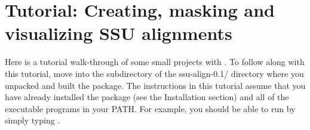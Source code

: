 \section{Tutorial: Creating, masking and visualizing SSU alignments}
\label{sec:tutorial}

Here is a tutorial walk-through of some small projects with
. To follow along with this tutorial, move into the
 subdirectory of the {ssu-align-0.1/} directory where
you unpacked and built the package.
The instructions in this tutorial assume that you have already
installed the package (see the Installation section)
and all of the  executable programs
in your PATH. For example, you should be able to run
 by simply typing .

\begin{comment}
\subsection{Files used in this tutorial}

In the first section of this tutorial we'll use the following files in
the \prog{tutorial} directory:

  \begin{sreitems}{}
  \item[\prog{seed-15.fa}] a sequence file containing
    fifteen SSU rRNA sequences, created specifically for use in this
    tutorial. These are full or partial sequences from the archaeal,
    bacterial and eukaryotic default \sft{crw} seed alignments used to
    build the default \software{ssu-align} models.
  \end{sreitems}
\end{comment}






\newpage


\newpage


\newpage




%
%
